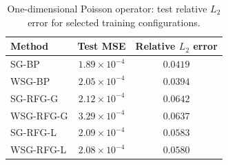 \begin{table}[t]
  \centering
  \caption{One-dimensional Poisson operator: test relative $L_2$ error for selected training configurations.}
  \label{tab:rfg:poisson}
  \small
  \begin{tabular}{@{}lcc@{}}
    \toprule
    Method & Test MSE & Relative $L_2$ error \\
    \midrule
    SG-BP    & $1.89\times 10^{-4}$ & $0.0419$ \\
    WSG-BP   & $2.05\times 10^{-4}$ & $0.0394$ \\
    SG-RFG-G & $2.12\times 10^{-4}$ & $0.0642$ \\
    WSG-RFG-G & $3.29\times 10^{-4}$ & $0.0637$ \\
    SG-RFG-L & $2.09\times 10^{-4}$ & $0.0583$ \\
    WSG-RFG-L & $2.08\times 10^{-4}$ & $0.0580$ \\
    \bottomrule
  \end{tabular}
\end{table}
